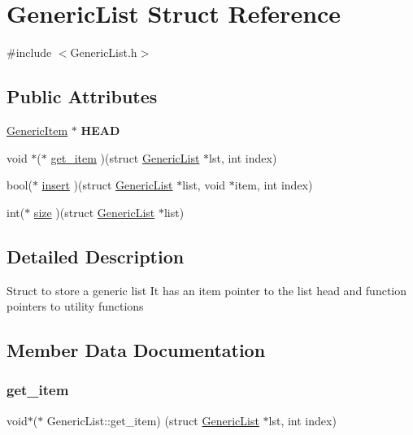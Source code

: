 \hypertarget{structGenericList}{}\section{Generic\+List Struct Reference}
\label{structGenericList}


{\ttfamily \#include $<$Generic\+List.\+h$>$}

\subsection*{Public Attributes}
\begin{DoxyCompactItemize}
\item 
\mbox{\label{structGenericList_a3292d39ebbade0002697f1525c4244f9}} 
\mbox{\hyperlink{structGenericItem}{Generic\+Item}} $\ast$ {\bfseries H\+E\+AD}
\item 
void $\ast$($\ast$ \mbox{\hyperlink{structGenericList_ab64a28fa5b3b9e2a906a2a23863f23b8}{get\+\_\+item}} )(struct \mbox{\hyperlink{structGenericList}{Generic\+List}} $\ast$lst, int index)
\item 
bool($\ast$ \mbox{\hyperlink{structGenericList_acc2ac3c8e5cc5239340b24894e3702f1}{insert}} )(struct \mbox{\hyperlink{structGenericList}{Generic\+List}} $\ast$list, void $\ast$item, int index)
\item 
int($\ast$ \mbox{\hyperlink{structGenericList_a7059c51c248a2415dd24baa99e3325c7}{size}} )(struct \mbox{\hyperlink{structGenericList}{Generic\+List}} $\ast$list)
\end{DoxyCompactItemize}


\subsection{Detailed Description}
Struct to store a generic list It has an item pointer to the list head and function pointers to utility functions 

\subsection{Member Data Documentation}
\mbox{\label{structGenericList_ab64a28fa5b3b9e2a906a2a23863f23b8}} 
\subsubsection{\texorpdfstring{get\+\_\+item}{get\_item}}
{\footnotesize\ttfamily void$\ast$($\ast$ Generic\+List\+::get\+\_\+item) (struct \mbox{\hyperlink{structGenericList}{Generic\+List}} $\ast$lst, int index)}

